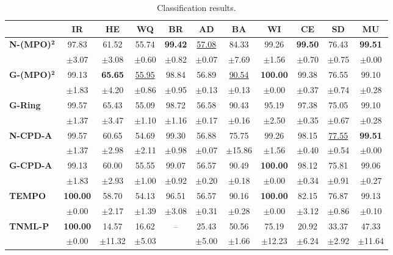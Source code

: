 \begin{table}[ht]
\centering
\small
\caption{Classification results.}
\label{tab:classification_results}
\begin{tabular}{lcccccccccc}
\toprule
& IR & HE & WQ & BR & AD & BA & WI & CE & SD & MU \\
\midrule
\textbf{N-(MPO)}$\bm{^2}$ & 97.83 & 61.52 & 55.74 & \textbf{99.42} & \underline{57.08} & 84.33 & 99.26 & \textbf{99.50} & 76.43 & \textbf{99.51} \\
 & $\pm$3.07 & $\pm$3.08 & $\pm$0.60 & $\pm$0.82 & $\pm$0.07 & $\pm$7.69 & $\pm$1.56 & $\pm$0.70 & $\pm$0.75 & $\pm$0.00 \\
\midrule
\textbf{G-(MPO)}$\bm{^2}$ & 99.13 & \textbf{65.65} & \underline{55.95} & 98.84 & 56.89 & \underline{90.54} & \textbf{100.00} & 99.38 & 76.55 & 99.10 \\
 & $\pm$1.83 & $\pm$4.20 & $\pm$0.86 & $\pm$0.95 & $\pm$0.13 & $\pm$0.13 & $\pm$0.00 & $\pm$0.37 & $\pm$0.74 & $\pm$0.28 \\
\midrule
\textbf{G-Ring} & 99.57 & 65.43 & 55.09 & 98.72 & 56.58 & 90.43 & 95.19 & 97.38 & 75.05 & 99.10 \\
 & $\pm$1.37 & $\pm$3.47 & $\pm$1.10 & $\pm$1.16 & $\pm$0.17 & $\pm$0.16 & $\pm$2.50 & $\pm$0.35 & $\pm$0.67 & $\pm$0.28 \\
\midrule
\midrule
\textbf{N-CPD-A} & 99.57 & 60.65 & 54.69 & 99.30 & 56.88 & 75.75 & 99.26 & 98.15 & \underline{77.55} & \textbf{99.51} \\
 & $\pm$1.37 & $\pm$2.98 & $\pm$2.11 & $\pm$0.98 & $\pm$0.07 & $\pm$15.86 & $\pm$1.56 & $\pm$0.40 & $\pm$0.54 & $\pm$0.00 \\
\midrule
\textbf{G-CPD-A} & 99.13 & 60.00 & 55.55 & 99.07 & 56.57 & 90.49 & \textbf{100.00} & 98.12 & 75.81 & 99.06 \\
 & $\pm$1.83 & $\pm$2.93 & $\pm$1.00 & $\pm$0.92 & $\pm$0.20 & $\pm$0.18 & $\pm$0.00 & $\pm$0.34 & $\pm$0.91 & $\pm$0.27 \\
\midrule
\textbf{TEMPO} & \textbf{100.00} & 58.70 & 54.13 & 96.51 & 56.57 & 90.16 & \textbf{100.00} & 82.15 & 76.87 & 99.13 \\
 & $\pm$0.00 & $\pm$2.17 & $\pm$1.39 & $\pm$3.08 & $\pm$0.31 & $\pm$0.28 & $\pm$0.00 & $\pm$3.12 & $\pm$0.86 & $\pm$0.10 \\
\midrule
\midrule
\textbf{TNML-P} & \textbf{100.00} & 14.57 & 16.62 & -- & 25.43 & 50.56 & 75.19 & 20.92 & 33.37 & 47.33 \\
 & $\pm$0.00 & $\pm$11.32 & $\pm$5.03 &  & $\pm$5.00 & $\pm$1.66 & $\pm$12.23 & $\pm$6.24 & $\pm$2.92 & $\pm$11.64 \\

\end{tabular}
\end{table}
